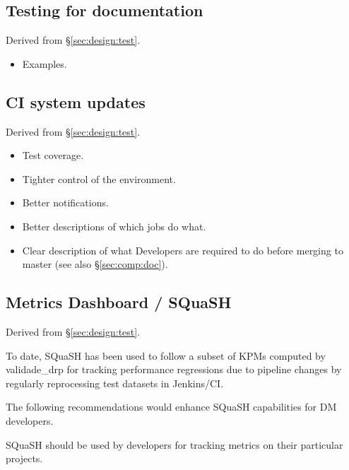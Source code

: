 \subsection{Testing for documentation}

Derived from \S\ref{sec:design:test}.


\begin{itemize}

  \item{Examples.}

\end{itemize}

\subsection{CI system updates}
\label{sec:comp:ci}

Derived from \S\ref{sec:design:test}.


\begin{itemize}

  \item{Test coverage.}
  \item{Tighter control of the environment.}
  \item{Better notifications.}
  \item{Better descriptions of which jobs do what.}
  \item{Clear description of what Developers are required to do before merging
  to master (see also \S\ref{sec:comp:doc}).}

\end{itemize}


\subsection{Metrics Dashboard / SQuaSH}

Derived from \S\ref{sec:design:test}.


To date, SQuaSH has been used to follow a subset of KPMs computed by validade_drp for tracking performance regressions due to pipeline changes by regularly reprocessing test datasets in Jenkins/CI.

The following recommendations would enhance SQuaSH capabilities for DM developers.

\begin{recommendation}
SQuaSH should be used by developers for tracking metrics on their particular projects.
\end{recommendation}

